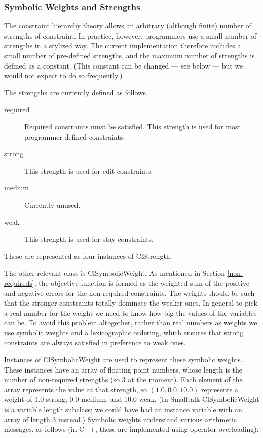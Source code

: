 \documentclass{article}
\begin{document}
\subsubsection{Symbolic Weights and Strengths}
\label{symweights}

The constraint hierarchy theory allows an arbitrary (although finite)
number of strengths of constraint.  In practice, however, programmers use a
small number of strengths in a stylized way.  The current implementation
therefore includes a small number of pre-defined strengths, and the maximum
number of strengths is defined as a constant.  (This constant can be
changed --- see below --- but we would not expect to do so frequently.)

The strengths are currently defined as follows.

\begin{description}

\item[{\sf required}]  Required constraints must be satisfied.  This
strength is used for most programmer-defined constraints.

\item[{\sf strong}] This strength is used for edit constraints.

\item[{\sf medium}] Currently unused.  

\item[{\sf weak}] This strength is used for stay constraints.

\end{description}

These are represented as four instances of {\sf ClStrength}.

The other relevant class is {\sf ClSymbolicWeight}.  As mentioned in
Section \ref{non-requireds}, the objective function is formed as the
weighted sum of the positive and negative errors for the non-required
constraints.  The weights should be such that the stronger constraints
totally dominate the weaker ones.  In general to pick a real number for the
weight we need to know how big the values of the variables can be.  To
avoid this problem altogether, rather than real numbers as weights we use
symbolic weights and a lexicographic ordering, which ensures that strong
constraints are always satisfied in preference to weak ones.  

Instances of {\sf ClSymbolicWeight} are used to represent these symbolic
weights.  These instances have an array of floating point numbers, whose
length is the number of non-required strengths (so 3 at the moment).  Each
element of the array represents the value at that strength, so $(1.0, 0.0,
10.0)$ represents a weight of 1.0 {\sf strong}, 0.0 {\sf medium}, and 10.0
{\sf weak}.  (In Smalltalk {\sf ClSymbolicWeight} is a variable length
subclass; we could have had an instance variable with an array of length 3
instead.)   Symbolic weights understand various arithmetic messages, as
follows (in C++, these are implemented using operator overloading):
\end{document}
